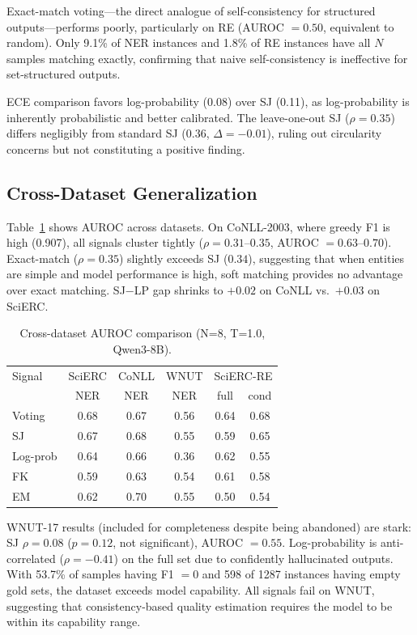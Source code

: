 \documentclass[11pt,a4paper]{article}
\begin{document}
Exact-match voting---the direct analogue of self-consistency for structured outputs---performs poorly, particularly on RE (AUROC $= 0.50$, equivalent to random). Only 9.1\% of NER instances and 1.8\% of RE instances have all $N$ samples matching exactly, confirming that naive self-consistency is ineffective for set-structured outputs.

ECE comparison favors log-probability (0.08) over SJ (0.11), as log-probability is inherently probabilistic and better calibrated. The leave-one-out SJ ($\rho = 0.35$) differs negligibly from standard SJ ($0.36$, $\Delta = -0.01$), ruling out circularity concerns but not constituting a positive finding.

\subsection{Cross-Dataset Generalization}
\label{sec:cross_dataset}

Table~\ref{tab:cross_dataset} shows AUROC across datasets. On CoNLL-2003, where greedy F1 is high (0.907), all signals cluster tightly ($\rho = 0.31$--$0.35$, AUROC $= 0.63$--$0.70$). Exact-match ($\rho = 0.35$) slightly exceeds SJ ($0.34$), suggesting that when entities are simple and model performance is high, soft matching provides no advantage over exact matching. SJ$-$LP gap shrinks to $+0.02$ on CoNLL vs.\ $+0.03$ on SciERC.

\begin{table}[t]
\centering
\small
\caption{Cross-dataset AUROC comparison (N=8, T=1.0, Qwen3-8B).}
\label{tab:cross_dataset}
\begin{tabular}{lccccc}
\toprule
Signal & SciERC & CoNLL & WNUT & \multicolumn{2}{c}{SciERC-RE} \\
 & NER & NER & NER & full & cond \\
\midrule
Voting & 0.68 & 0.67 & 0.56 & 0.64 & 0.68 \\
SJ & 0.67 & 0.68 & 0.55 & 0.59 & 0.65 \\
Log-prob & 0.64 & 0.66 & 0.36 & 0.62 & 0.55 \\
FK & 0.59 & 0.63 & 0.54 & 0.61 & 0.58 \\
EM & 0.62 & 0.70 & 0.55 & 0.50 & 0.54 \\
\bottomrule
\end{tabular}
\end{table}

WNUT-17 results (included for completeness despite being abandoned) are stark: SJ $\rho = 0.08$ ($p = 0.12$, not significant), AUROC $= 0.55$. Log-probability is anti-correlated ($\rho = -0.41$) on the full set due to confidently hallucinated outputs. With 53.7\% of samples having F1 $= 0$ and 598 of 1287 instances having empty gold sets, the dataset exceeds model capability. All signals fail on WNUT, suggesting that consistency-based quality estimation requires the model to be within its capability range.
\end{document}
